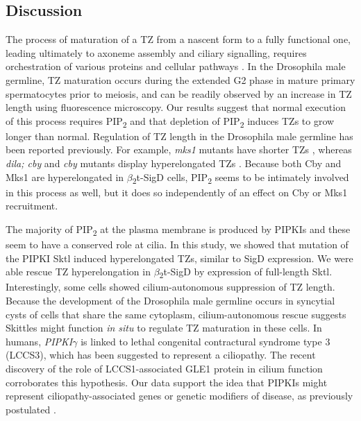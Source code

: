 \documentclass[12pt, twoside, letterpaper]{article}
\newcommand{\PIP}{PIP\textsubscript{2}}
\newcommand{\sigd}{$\beta$\textsubscript{2}t-SigD}
\begin{document}
\begin{doublespacing}
\begin{linenumbers}
    \section*{Discussion}
    The process of maturation of a TZ from a nascent form to a fully functional one,
    leading ultimately to axoneme assembly and ciliary signalling,
    requires orchestration of various proteins and cellular pathways
    \citep{reiter2012base, gonccalves2017ciliary}.
    In the Drosophila male germline, TZ maturation occurs during the
    extended G2 phase in mature primary spermatocytes prior to meiosis, and can be readily
    observed by an increase in TZ length using fluorescence microscopy.
    Our results suggest that normal execution of this process
    requires \PIP{} and that depletion of \PIP{} induces TZs to
    grow longer than normal.
    Regulation of TZ length in the Drosophila male germline has been reported
    previously.
    For example, \textit{mks1} mutants have shorter TZs \citep{pratt2016drosophila},
    whereas
    \textit{dila; cby} and \textit{cby} mutants display hyperelongated TZs
    \citep{enjolras2012drosophila,vieillard2016transition}.
    Because both Cby and Mks1 are hyperelongated in \sigd{} cells,
    \PIP{} seems to be intimately involved in this process as well, but it does
    so independently of an effect on Cby or Mks1 recruitment.

    The majority of \PIP{} at the plasma membrane is produced by PIPKIs
    \citep{balla2013phosphoinositides, hammond2012pi4p}
    and these seem to have a conserved role at cilia.
    In this study, we showed that mutation of the PIPKI Sktl
    induced hyperelongated TZs, similar to SigD expression.
    We were able rescue TZ hyperelongation in \sigd{} by expression of full-length Sktl.
    Interestingly, some cells showed cilium-autonomous suppression of TZ length.
    Because the development of the Drosophila male germline occurs in syncytial cysts
    of cells that share the same cytoplasm,
    cilium-autonomous rescue suggests Skittles might function \textit{in situ}
    to regulate TZ maturation in these cells.
    In humans, \textit{PIPKI$\gamma$} is linked to lethal congenital contractural
    syndrome type 3 (LCCS3), which has been suggested to represent a ciliopathy.
    The recent discovery of the role of LCCS1-associated GLE1 protein in cilium
    function \citep{jao2017role} corroborates this hypothesis.
    Our data support the idea that PIPKIs might represent ciliopathy-associated genes
    or genetic modifiers of disease, as previously postulated
    \citep{xu2016phosphatidylinositol}.


\end{linenumbers}
\end{doublespacing}
\end{document}
